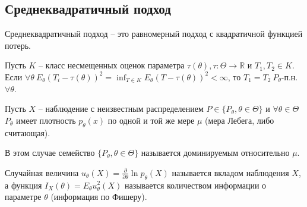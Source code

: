 \subsection{Среднеквадратичный подход}
\begin{definition}
Среднеквадратичный подход -- это равномерный подход с квадратичной функцией потерь.
\end{definition}
\begin{exercise}
Пусть $\displaystyle K$ -- класс несмещенных оценок параметра $\displaystyle \tau ( \theta ) ,\tau :\Theta \rightarrow \mathbb{R}$ и $\displaystyle T_{1} ,T_{2} \in K$. Если $\displaystyle \forall \theta \ E_{\theta }( T_{i} -\tau ( \theta ))^{2} =\inf_{T\in K} E_{\theta }( T-\tau ( \theta ))^{2} < \infty $, то $\displaystyle T_{1} =T_{2} \ P_{\theta }$-п.н. $\displaystyle \forall \theta $.
\end{exercise}
Пусть $\displaystyle X$ -- наблюдение с неизвестным распределением $\displaystyle P\in \{P_{\theta } ,\theta \in \Theta \}$ и $\displaystyle \forall \theta \in \Theta $ $\displaystyle P_{\theta }$ имеет плотность $\displaystyle p_{\theta }( x)$ по одной и той же мере $\displaystyle \mu $ (мера Лебега, либо считающая).
\begin{definition}
В этом случае семейство $\displaystyle \{P_{\theta } ,\theta \in \Theta \}$ называется доминируемым относительно $\displaystyle \mu $.
\end{definition}
\begin{definition}
Случайная величина $\displaystyle u_{\theta }( X) =\frac{\partial }{\partial \theta }\ln p_{\theta }( X)$ называется вкладом наблюдения $\displaystyle X$, а функция $\displaystyle I_{X}( \theta ) =E_{\theta } u_{\theta }^{2}( X)$ называется количеством информации о параметре $\displaystyle \theta $ (информация по Фишеру).
\end{definition}
